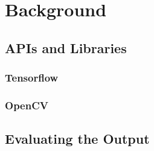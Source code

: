 \chapter{Background}
\label{background}













\section{APIs and Libraries}
\subsection*{Tensorflow}


\subsection*{OpenCV}


% 

% 

\section{Evaluating the Output}


